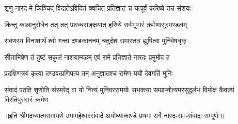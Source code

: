 \twolineshloka
{शृणु नारद मे किञ्चिद् विद्यतेऽविदितं क्वचित्}
{प्रतिज्ञातं च यत्पूर्वं करिष्ये तन्न संशयः} %

\twolineshloka
{किन्तु कालानुरोधेन तत् तत् प्रारब्धसङ्क्षयात्}
{हरिष्ये सर्वभूभारं क्रमेणासुरमण्डलम्} %

\twolineshloka
{रावणस्य विनाशार्थं श्वो गन्ता दण्डकाननम्}
{चतुर्दश समास्तत्र ह्युषित्वा मुनिवेषधृक्} %

\twolineshloka
{सीतामिषेण तं दुष्टं सकुलं नाशयाम्यहम्}
{एवं रामे प्रतिज्ञाते नारदः प्रमुमोद ह} %

\twolineshloka
{प्रदक्षिणत्रयं कृत्वा दण्डवत्प्रणिपत्य तम्}
{अनुज्ञातश्च रामेण ययौ देवगतिं मुनिः} %

\fourlineindentedshloka
{संवादं पठति शृणोति संस्मरेद् वा}
{यो नित्यं मुनिवररामयोः सभक्त्या}
{सम्प्राप्नोत्यमरसुदुर्लभं विमोक्षं}
{कैवल्यं विरतिपुरःसरं क्रमेण} %

{॥इति श्रीमदध्यात्मरामायणे उमामहेश्वरसंवादे
अयोध्याकाण्डे प्रथमः सर्गे  नारद-राम-संवादः  सम्पूर्णः॥}
